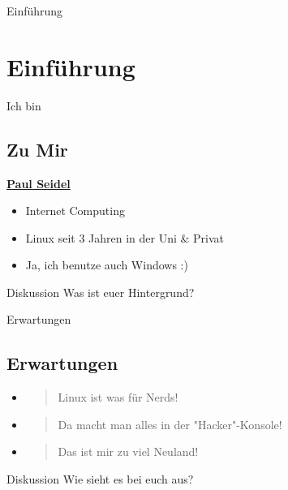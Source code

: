 
\begin{frame}{Einführung}
    \section{Einführung}\label{sec:einfuhrung}

\end{frame}

\begin{frame}{Ich bin}
    \subsection{Zu Mir}\label{subsec:zu-mir}

    \underline{\textbf{Paul Seidel}}

    \begin{itemize}
        \item Internet Computing
        \item Linux seit 3 Jahren in der Uni \& Privat
        \item Ja, ich benutze auch Windows :)
    \end{itemize}

    \pause
    \vspace{0.5cm}
    \begin{exampleblock}{Diskussion}
        Was ist euer Hintergrund?
    \end{exampleblock}

\end{frame}

\begin{frame}{Erwartungen}
    \subsection{Erwartungen}\label{subsec:erwartungen}

    \begin{itemize}
        \item \begin{quote}
                  Linux ist was für Nerds!
        \end{quote}\pause
        \item \begin{quote}
                  Da macht man alles in der "Hacker"-Konsole!
        \end{quote}\pause
        \item \begin{quote}
                  Das ist mir zu viel Neuland!
        \end{quote}
    \end{itemize}

    \pause
    \vspace{0.5cm}
    \begin{exampleblock}{Diskussion}
        Wie sieht es bei euch aus?
    \end{exampleblock}

\end{frame}

